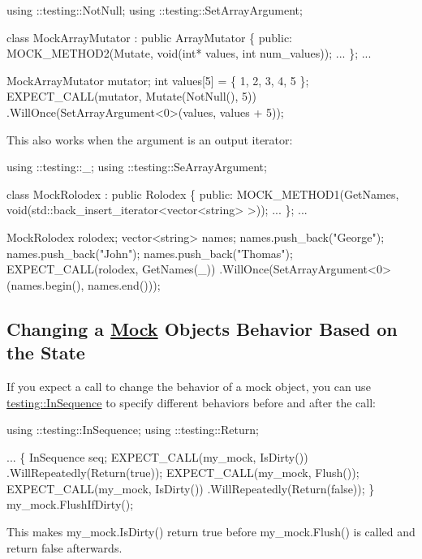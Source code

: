 \begin{DoxyCode}
using ::testing::NotNull;
using ::testing::SetArrayArgument;

class MockArrayMutator : public ArrayMutator \{
 public:
  MOCK\_METHOD2(Mutate, void(int* values, int num\_values));
  ...
\};
...

  MockArrayMutator mutator;
  int values[5] = \{ 1, 2, 3, 4, 5 \};
  EXPECT\_CALL(mutator, Mutate(NotNull(), 5))
      .WillOnce(SetArrayArgument<0>(values, values + 5));
\end{DoxyCode}


This also works when the argument is an output iterator\+:


\begin{DoxyCode}
using ::testing::\_;
using ::testing::SeArrayArgument;

class MockRolodex : public Rolodex \{
 public:
  MOCK\_METHOD1(GetNames, void(std::back\_insert\_iterator<vector<string> >));
  ...
\};
...

  MockRolodex rolodex;
  vector<string> names;
  names.push\_back("George");
  names.push\_back("John");
  names.push\_back("Thomas");
  EXPECT\_CALL(rolodex, GetNames(\_))
      .WillOnce(SetArrayArgument<0>(names.begin(), names.end()));
\end{DoxyCode}


\subsection*{Changing a \hyperlink{class_mock}{Mock} Object\textquotesingle{}s Behavior Based on the State}

If you expect a call to change the behavior of a mock object, you can use {\ttfamily \hyperlink{classtesting_1_1_in_sequence}{testing\+::\+In\+Sequence}} to specify different behaviors before and after the call\+:


\begin{DoxyCode}
using ::testing::InSequence;
using ::testing::Return;

...
  \{
    InSequence seq;
    EXPECT\_CALL(my\_mock, IsDirty())
        .WillRepeatedly(Return(true));
    EXPECT\_CALL(my\_mock, Flush());
    EXPECT\_CALL(my\_mock, IsDirty())
        .WillRepeatedly(Return(false));
  \}
  my\_mock.FlushIfDirty();
\end{DoxyCode}


This makes {\ttfamily my\+\_\+mock.\+Is\+Dirty()} return {\ttfamily true} before {\ttfamily my\+\_\+mock.\+Flush()} is called and return {\ttfamily false} afterwards.

